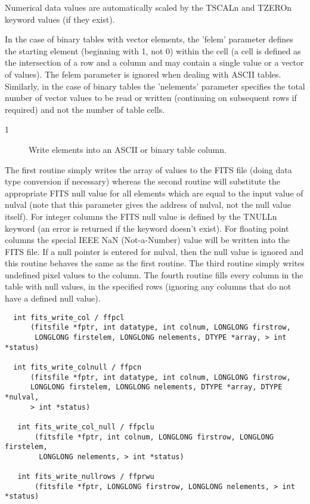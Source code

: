 \documentclass[11pt]{book}
\begin{document}
Numerical data values are automatically scaled by the TSCALn and TZEROn
keyword values (if they exist).

In the case of binary tables with vector elements, the 'felem'
parameter defines the starting element (beginning with 1, not 0) within
the cell (a cell is defined as the intersection of a row and a column
and may contain a single value or a vector of values).  The felem
parameter is ignored when dealing with ASCII tables. Similarly, in the
case of binary tables the 'nelements' parameter specifies the total
number of vector values to be read or written (continuing on subsequent
rows if required) and not the number of table cells.


\begin{description}
\item[1 ] Write elements into an ASCII or binary table column.
\end{description}
   The first routine simply writes the array of values to the FITS file
   (doing data type conversion if necessary) whereas the second routine
   will substitute the  appropriate FITS null value for all elements
   which are equal to the input value of nulval (note that this
   parameter gives the address of nulval, not the null value
   itself).  For integer columns the FITS null value is defined by the
   TNULLn keyword (an error is returned if the keyword doesn't exist).
   For floating point columns  the special IEEE NaN (Not-a-Number)
   value will be written into the FITS file.  If a null pointer is
   entered for nulval, then the null value is ignored and this routine
   behaves the same as the first routine.  The third routine
   simply writes undefined pixel values to the column.  The fourth routine
   fills every column in the table with null values, in the specified
   rows (ignoring any columns that do not have a defined null value).
   \label{ffpcl} \label{ffpcn} \label{ffpclu}

\begin{verbatim}
  int fits_write_col / ffpcl
      (fitsfile *fptr, int datatype, int colnum, LONGLONG firstrow,
       LONGLONG firstelem, LONGLONG nelements, DTYPE *array, > int *status)

  int fits_write_colnull / ffpcn
      (fitsfile *fptr, int datatype, int colnum, LONGLONG firstrow,
      LONGLONG firstelem, LONGLONG nelements, DTYPE *array, DTYPE *nulval,
      > int *status)

   int fits_write_col_null / ffpclu
       (fitsfile *fptr, int colnum, LONGLONG firstrow, LONGLONG firstelem,
        LONGLONG nelements, > int *status)

   int fits_write_nullrows / ffprwu
       (fitsfile *fptr, LONGLONG firstrow, LONGLONG nelements, > int *status)
\end{verbatim}
\end{document}
